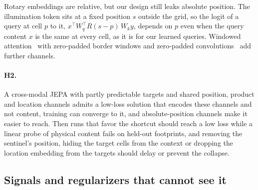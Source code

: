 Rotary embeddings are relative, but our design still leaks absolute position. The illumination token sits at a fixed position $s$ outside the grid, so the logit of a query at cell $p$ to it, $x^\top W_q^\top R(s{-}p)\, W_k y$, depends on $p$ even when the query content $x$ is the same at every cell, as it is for our learned queries. Windowed attention~\cite{zhu2021long} with zero-padded border windows and zero-padded convolutions~\cite{islam2020much,kayhan2020translation} add further channels.

\paragraph{H2.} A cross-modal JEPA with partly predictable targets and shared position, product and location channels admits a low-loss solution that encodes these channels and not content, training can converge to it, and absolute-position channels make it easier to reach. Then runs that favor the shortcut should reach a low loss while a linear probe of physical content fails on held-out footprints, and removing the sentinel's position, hiding the target cells from the context or dropping the location embedding from the targets should delay or prevent the collapse.

\subsection{Signals and regularizers that cannot see it}
\label{sec:h3}

